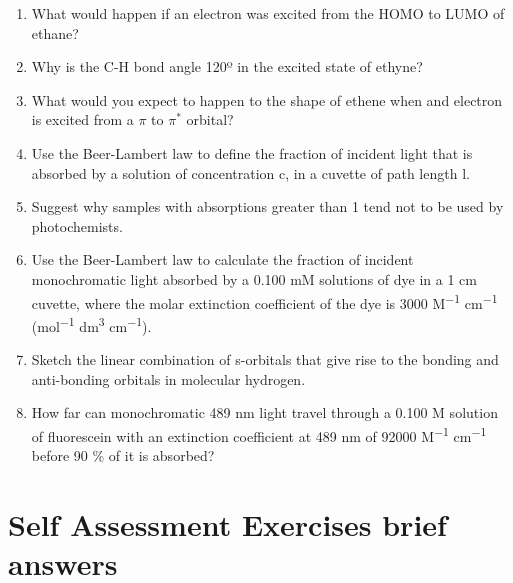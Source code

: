 \documentclass[
]{book}
\providecommand{\tightlist}{%
  \setlength{\itemsep}{0pt}\setlength{\parskip}{0pt}}
\begin{document}
\begin{enumerate}
\def\labelenumi{\arabic{enumi}.}
\tightlist
\item
  What would happen if an electron was excited from the HOMO to LUMO of ethane?
\item
  Why is the C-H bond angle 120º in the excited state of ethyne?
\item
  What would you expect to happen to the shape of ethene when and electron is excited from a \(\pi\) to \(\pi^\ast\) orbital?
\item
  Use the Beer-Lambert law to define the fraction of incident light that is absorbed by a solution of concentration c, in a cuvette of path length l.
\item
  Suggest why samples with absorptions greater than 1 tend not to be used by photochemists.
\item
  Use the Beer-Lambert law to calculate the fraction of incident monochromatic light absorbed by a 0.100 mM solutions of dye in a 1 cm cuvette, where the molar extinction coefficient of the dye is 3000 M\textsuperscript{−1} cm\textsuperscript{−1} (mol\textsuperscript{−1} dm\textsuperscript{3} cm\textsuperscript{−1}).
\item
  Sketch the linear combination of s-orbitals that give rise to the bonding and anti-bonding orbitals in molecular hydrogen.
\item
  How far can monochromatic 489 nm light travel through a 0.100 M solution of fluorescein with an extinction coefficient at 489 nm of 92000 M\textsuperscript{−1} cm\textsuperscript{−1} before 90 \% of it is absorbed?
\end{enumerate}

\hypertarget{sec:SSQabsans}{%
\section{Self Assessment Exercises brief answers}\label{sec:SSQabsans}}
\end{document}
